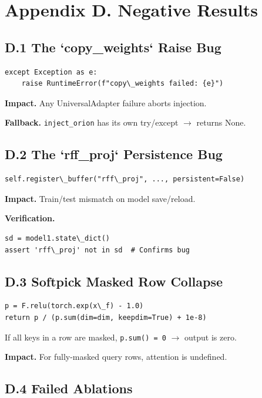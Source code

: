 
\section{Appendix D. Negative Results}

\subsection{D.1 The `copy\_weights` Raise Bug}

\begin{lstlisting}
except Exception as e:
    raise RuntimeError(f"copy\_weights failed: {e}")
\end{lstlisting}

\textbf{Impact.} Any UniversalAdapter failure aborts injection.

\textbf{Fallback.} \texttt{inject\_orion} has its own try/except $\to$ returns None.

\subsection{D.2 The `rff\_proj` Persistence Bug}

\begin{lstlisting}
self.register\_buffer("rff\_proj", ..., persistent=False)
\end{lstlisting}

\textbf{Impact.} Train/test mismatch on model save/reload.

\textbf{Verification.}

\begin{lstlisting}
sd = model1.state\_dict()
assert 'rff\_proj' not in sd  # Confirms bug
\end{lstlisting}

\subsection{D.3 Softpick Masked Row Collapse}

\begin{lstlisting}
p = F.relu(torch.exp(x\_f) - 1.0)
return p / (p.sum(dim=dim, keepdim=True) + 1e-8)
\end{lstlisting}

If all keys in a row are masked, \texttt{p.sum() = 0} $\to$ output is zero.

\textbf{Impact.} For fully-masked query rows, attention is undefined.

\subsection{D.4 Failed Ablations}

